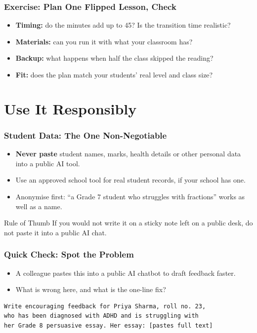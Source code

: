 \begin{frame}[fragile]\frametitle{Exercise: Plan One Flipped Lesson, Check}
\begin{itemize}
\item \textbf{Timing:} do the minutes add up to 45? Is the transition time realistic?
\item \textbf{Materials:} can you run it with what your classroom has?
\item \textbf{Backup:} what happens when half the class skipped the reading?
\item \textbf{Fit:} does the plan match your students' real level and class size?
\end{itemize}
\end{frame}

\section[Checks]{Use It Responsibly}

\begin{frame}[fragile]\frametitle{Student Data: The One Non-Negotiable}
\begin{itemize}
\item \textbf{Never paste} student names, marks, health details or other personal data into a public AI tool.
\item Use an approved school tool for real student records, if your school has one.
\item Anonymise first: ``a Grade 7 student who struggles with fractions'' works as well as a name.
\end{itemize}
\begin{alertblock}{Rule of Thumb}
If you would not write it on a sticky note left on a public desk, do not paste it into a public AI chat.
\end{alertblock}
\end{frame}

\begin{frame}[fragile]\frametitle{Quick Check: Spot the Problem}
\begin{itemize}
\item A colleague pastes this into a public AI chatbot to draft feedback faster.
\item What is wrong here, and what is the one-line fix?
\end{itemize}
\begin{lstlisting}[language={}]
Write encouraging feedback for Priya Sharma, roll no. 23,
who has been diagnosed with ADHD and is struggling with
her Grade 8 persuasive essay. Her essay: [pastes full text]
\end{lstlisting}
\end{frame}


